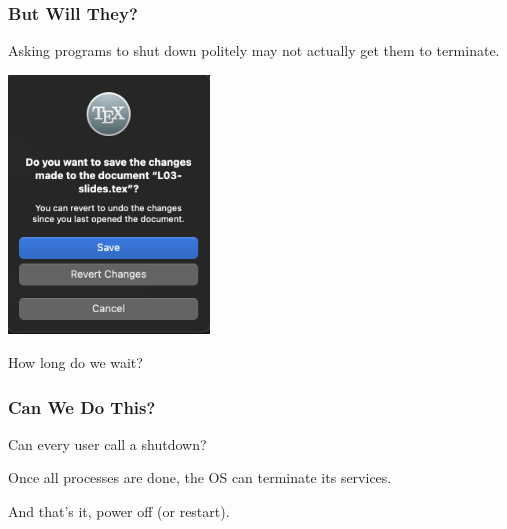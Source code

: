 \begin{frame}
\frametitle{But Will They?}

Asking programs to shut down politely may not actually get them to terminate.

\begin{center}
	\includegraphics[width=0.4\textwidth]{images/savework.png}
\end{center}

How long do we wait?

\end{frame}

\begin{frame}
\frametitle{Can We Do This?}

Can every user call a shutdown?

Once all processes are done, the OS can terminate its services.

And that's it, power off (or restart).

\end{frame}





